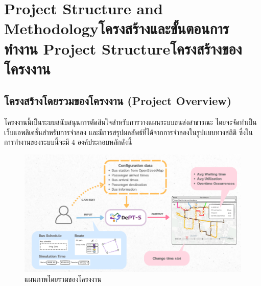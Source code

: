\chapter{\ifproject%
\ifenglish Project Structure and Methodology\else โครงสร้างและขั้นตอนการทำงาน\fi
\else%
\ifenglish Project Structure\else โครงสร้างของโครงงาน\fi
\fi
}

\makeatletter


\makeatother

\section{โครงสร้างโดยรวมของโครงงาน (Project Overview) }
\begin{mypara}
    \indent โครงงานนี้เป็นระบบสนับสนุนการตัดสินใจสำหรับการวางแผนระบบขนส่งสาธารณะ 
    โดยจะจัดทำเป็นเว็บแอพลิเคชั่นสำหรับการจำลอง และมีการสรุปผลลัพธ์ที่ได้จากการจำลองในรูปแบบทางสถิติ
    ซึ่งในการทำงานของระบบนี้จะมี 4 องค์ประกอบหลักดังนี้  
\end{mypara}


\begin{figure}[H]
    \centering
    \includegraphics[width=\textwidth,height=0.9\textheight,keepaspectratio]{overview.png}
    \caption{แผนภาพโดยรวมของโครงงาน}
    \label{fig:overview}
\end{figure}

